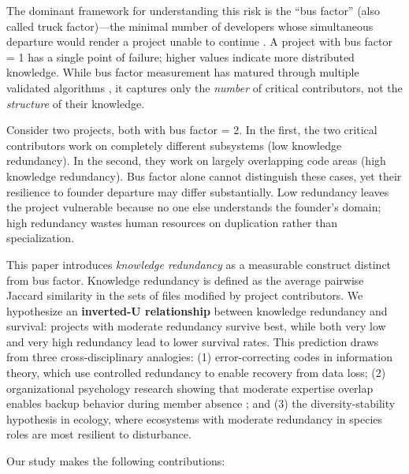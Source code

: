 \documentclass[11pt,letterpaper]{article}
\begin{document}
The dominant framework for understanding this risk is the ``bus factor'' (also called truck factor)---the minimal number of developers whose simultaneous departure would render a project unable to continue \cite{Cosentino2015}. A project with bus factor = 1 has a single point of failure; higher values indicate more distributed knowledge. While bus factor measurement has matured through multiple validated algorithms \cite{Avelino2019, Cosentino2015, Ferreira2019}, it captures only the \textit{number} of critical contributors, not the \textit{structure} of their knowledge.

Consider two projects, both with bus factor = 2. In the first, the two critical contributors work on completely different subsystems (low knowledge redundancy). In the second, they work on largely overlapping code areas (high knowledge redundancy). Bus factor alone cannot distinguish these cases, yet their resilience to founder departure may differ substantially. Low redundancy leaves the project vulnerable because no one else understands the founder's domain; high redundancy wastes human resources on duplication rather than specialization.

This paper introduces \textit{knowledge redundancy} as a measurable construct distinct from bus factor. Knowledge redundancy is defined as the average pairwise Jaccard similarity in the sets of files modified by project contributors. We hypothesize an \textbf{inverted-U relationship} between knowledge redundancy and survival: projects with moderate redundancy survive best, while both very low and very high redundancy lead to lower survival rates. This prediction draws from three cross-disciplinary analogies: (1) error-correcting codes in information theory, which use controlled redundancy to enable recovery from data loss; (2) organizational psychology research showing that moderate expertise overlap enables backup behavior during member absence \cite{Ren2011}; and (3) the diversity-stability hypothesis in ecology, where ecosystems with moderate redundancy in species roles are most resilient to disturbance.

Our study makes the following contributions:
\end{document}
